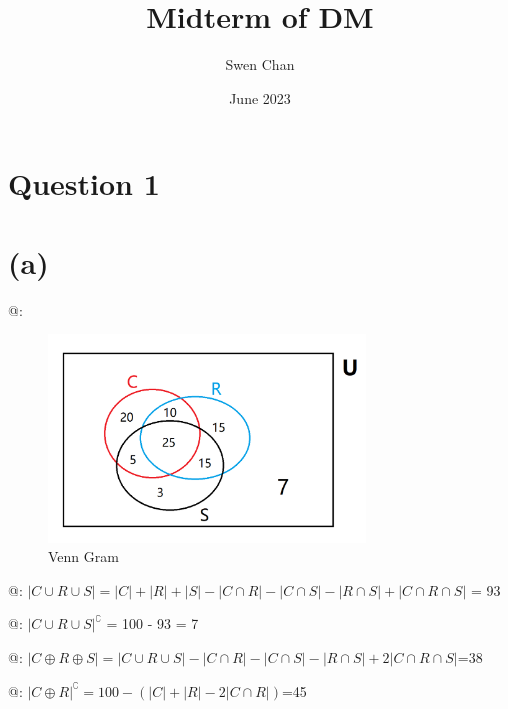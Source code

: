 \documentclass{article}
\title{Midterm of DM}
\author{Swen Chan}
\date{June 2023}
\makeatletter
\newcommand*{\rom}[1]{\expandafter\@slowromancap\romannumeral #1@}
\makeatother
\begin{document}
\maketitle

\section*{Question 1}

\section*{(a)}

\rom{1}:

\begin{figure}[h]
    \centering
    \includegraphics[width=0.75\textwidth]{Q1-1}
    \caption{Venn Gram}
    \label{fig:1}
\end{figure}

\rom{2}:
\(
|C \cup R \cup S| = |C| + |R| + |S| - |C \cap R| -|C \cap S| -|R \cap S| + |C \cap R \cap S|
\) 
= 93

\rom{3}:
\(|C \cup R \cup S|^\complement\) = 100 - 93 = 7

\rom{4}:
\(|C \oplus R \oplus S|=|C \cup R \cup S|-|C \cap R|-|C \cap S|-|R \cap S| + 2|C \cap R \cap S|\)=38

\rom{5}:
\(|C \oplus R|^\complement=100-(|C|+|R|-2|C\cap R|)\)=45
\end{document}
